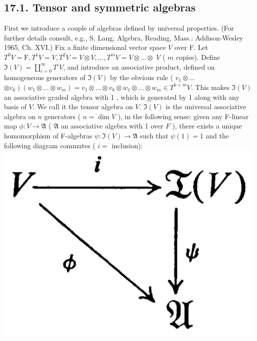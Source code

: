 \documentclass[10pt]{article}
\begin{document}
\subsection*{17.1. Tensor and symmetric algebras}
First we introduce a couple of algebras defined by universal properties. (For further details consult, e.g., S. Lang, Algebra, Reading, Mass.: Addison-Wesley 1965, Ch. XVI.) Fix a finite dimensional vector space $V$ over F. Let $T^{0} V=\mathrm{F}, T^{1} V=V, T^{2} V=V \otimes V, \ldots, T^{m} V=V \otimes \ldots \otimes$ $V$ ( $m$ copies). Define $\mathfrak{I}(V)=\coprod_{i=0}^{\infty} T^{i} V$, and introduce an associative product, defined on homogeneous generators of $\mathfrak{I}(V)$ by the obvious rule ( $v_{1} \otimes \ldots$ $\left.\otimes v_{k}\right)\left(w_{1} \otimes \ldots \otimes w_{m}\right)=v_{1} \otimes \ldots \otimes v_{k} \otimes w_{1} \otimes \ldots \otimes w_{m} \in T^{k+m} V$. This makes $\mathfrak{I}(V)$ an associative graded algebra with 1 , which is generated by 1 along with any basis of $V$. We call it the tensor algebra on $V$. $\mathfrak{I}(V)$ is the universal associative algebra on $n$ generators ( $n=\operatorname{dim} V$ ), in the following sense: given any F-linear map $\phi: V \rightarrow \mathfrak{A}$ ( $\mathfrak{A}$ an associative algebra with 1 over $F$ ), there exists a unique homomorphism of F-algebras $\psi: \mathfrak{I}(V) \rightarrow \mathfrak{A}$ such that $\psi(1)=1$ and the following diagram commutes ( $i=$ inclusion):\\
\includegraphics[max width=\textwidth, center]{2025_06_06_fac2836a92464059da43g-102}
\end{document}
